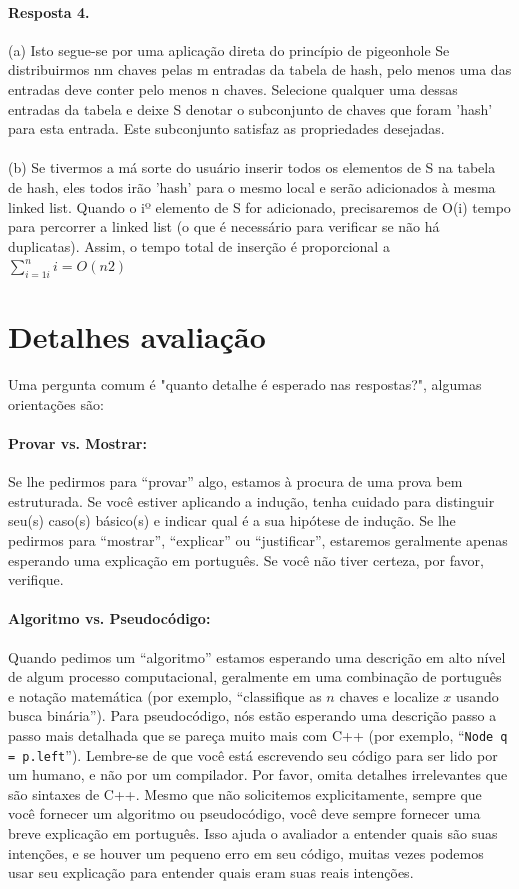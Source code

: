 \documentclass{article}
\begin{document}
\paragraph{Resposta 4.}

(a) Isto segue-se por uma aplicação direta do princípio de pigeonhole Se distribuirmos nm chaves pelas m entradas da tabela de hash, pelo menos uma das entradas deve conter pelo menos n chaves. Selecione qualquer uma dessas entradas da tabela e deixe S denotar o subconjunto de chaves que foram 'hash' para esta entrada. Este subconjunto satisfaz as propriedades desejadas.
\\
\\
(b) Se tivermos a má sorte do usuário inserir todos os elementos de S na tabela de hash, eles todos irão 'hash' para o mesmo local e serão adicionados à mesma linked list. Quando o iº elemento de S for adicionado, precisaremos de O(i) tempo para percorrer a linked list (o que é necessário para verificar se não há duplicatas). Assim, o tempo total de inserção é proporcional a $\sum\limits_{i = 1i}^{n}i = O(n2)$


\section{Detalhes avaliação}
Uma pergunta comum é "quanto detalhe é esperado nas respostas?", algumas orientações são:
%
\paragraph{Provar vs. Mostrar:}
Se lhe pedirmos para “provar” algo, estamos à procura de uma prova bem estruturada. Se você estiver aplicando a indução, tenha cuidado para distinguir seu(s) caso(s) básico(s) e indicar qual é a sua hipótese de indução. Se lhe pedirmos para “mostrar”, “explicar” ou “justificar”, estaremos geralmente apenas esperando uma explicação em português. Se você não tiver certeza, por favor, verifique.

\paragraph{Algoritmo vs. Pseudocódigo:} Quando pedimos um “algoritmo” estamos esperando uma descrição em alto nível de algum processo computacional, geralmente em uma combinação de português e notação matemática (por exemplo, “classifique as $n$ chaves e localize $x$ usando busca binária”). Para pseudocódigo, nós estão esperando uma descrição passo a passo mais detalhada que se pareça muito mais com C++ (por exemplo, “\texttt{Node q = p.left}”). Lembre-se de que você está escrevendo seu código para ser lido por um humano, e não por um compilador. Por favor, omita detalhes irrelevantes que são sintaxes de C++. Mesmo que não solicitemos explicitamente, sempre que você fornecer um algoritmo ou pseudocódigo, você deve sempre fornecer uma breve explicação em português. Isso ajuda o avaliador a entender quais são suas intenções, e se houver um pequeno erro em seu código, muitas vezes podemos usar seu explicação para entender quais eram suas reais intenções.
\end{document}
